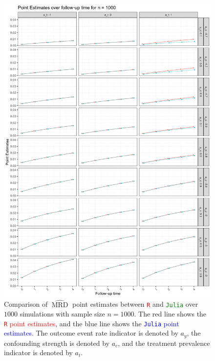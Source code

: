 \documentclass[pdflatex,sn-vancouver-ay]{sn-jnl}%
\theoremstyle{thmstyleone}%
\theoremstyle{thmstyletwo}%
\theoremstyle{thmstylethree}%
\newcommand{\Rlang}{\texttt{R}}
\newcommand{\julia}{\texttt{Julia}}
\begin{document}
\begin{appendices}
\newpage

\begin{figure}[H]
\centering
\includegraphics[height=0.95\textheight]{plots/plots_PE1000.png}
\caption{Comparison of $\widehat{\operatorname{MRD}}$ point estimates between \textcolor{red}{\Rlang{}} and \textcolor{green}{\julia{}} over $1000$ simulations with sample size $n = 1000$. The red line shows the \textcolor{red}{\Rlang{} point estimates}, and the blue line shows the \textcolor{blue}{\julia{} point estimates}. The outcome event rate indicator is denoted by $a_y$, the confounding strength is denoted by $a_c$, and the treatment prevalence indicator is denoted by $a_t$.}
\label{plt:PE1000}
\end{figure}

\newpage


\end{appendices}
\end{document}
